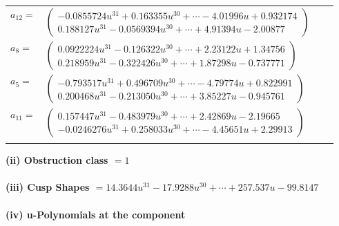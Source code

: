 \documentclass[1p]{elsarticle_modified}
\theoremstyle{definition}
\begin{document}
\begin{tabular}{m{7pt} m{180pt} m{7pt} m{180pt} }
\flushright $a_{12}=$&$\begin{pmatrix}-0.0855724 u^{31}+0.163355 u^{30}+\cdots-4.01996 u+0.932174\\0.188127 u^{31}-0.0569394 u^{30}+\cdots+4.91394 u-2.00877\end{pmatrix}$ \\
\flushright $a_{8}=$&$\begin{pmatrix}0.0922224 u^{31}-0.126322 u^{30}+\cdots+2.23122 u+1.34756\\0.218959 u^{31}-0.322426 u^{30}+\cdots+1.87298 u-0.737771\end{pmatrix}$ \\
\flushright $a_{5}=$&$\begin{pmatrix}-0.793517 u^{31}+0.496709 u^{30}+\cdots-4.79774 u+0.822991\\0.200468 u^{31}-0.213050 u^{30}+\cdots+3.85227 u-0.945761\end{pmatrix}$ \\
\flushright $a_{11}=$&$\begin{pmatrix}0.157447 u^{31}-0.483979 u^{30}+\cdots+2.42869 u-2.19665\\-0.0246276 u^{31}+0.258033 u^{30}+\cdots-4.45651 u+2.29913\end{pmatrix}$\\&\end{tabular}
\flushleft \textbf{(ii) Obstruction class $= 1$}\\~\\
\flushleft \textbf{(iii) Cusp Shapes $= 14.3644 u^{31}-17.9288 u^{30}+\cdots+257.537 u-99.8147$}\\~\\
\newpage\renewcommand{\arraystretch}{1}
\flushleft \textbf{(iv) u-Polynomials at the component}\newline \\
\end{document}
